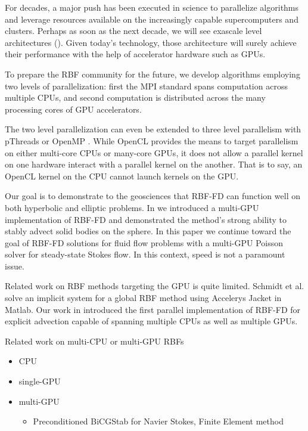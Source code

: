 For decades, a major push has been executed in science to parallelize algorithms and leverage resources available on the increasingly capable supercomputers and clusters. Perhaps as soon as the next decade, we will see exascale level architectures (\cite{ExaScaleRef}). Given today's technology, those architecture will surely achieve their performance with the help of accelerator hardware such as GPUs. 

To prepare the RBF community for the future, we develop algorithms employing two levels of parallelization: first the MPI standard spans computation across multiple CPUs, and second computation is distributed across the many processing cores of GPU accelerators. 

The two level parallelization can even be extended to three level parallelism
with pThreads or OpenMP \cite{NVidia_multi-gpu_example}. While OpenCL provides
the means to target parallelism on either multi-core CPUs or many-core GPUs, it
does not allow a parallel kernel on one hardware interact with a parallel kernel
on the another. That is to say, an OpenCL kernel on the CPU cannot launch
kernels on the GPU.  

Our goal is to demonstrate to the geosciences that RBF-FD can function well on
both hyperbolic and elliptic problems. In \cite{bolligFlyerErlebacher2011} we
introduced a multi-GPU implementation of RBF-FD and demonstrated the method's
strong ability to stably advect solid bodies on the sphere. In this paper we
continue toward the goal of RBF-FD solutions for fluid flow problems with a
multi-GPU Poisson solver for steady-state Stokes flow. In this context, speed is
not a paramount issue.

Related work on RBF methods targeting the GPU is quite limited. Schmidt et al.
\cite{Schmidt2009b} solve an implicit system for a global RBF method using
Accelerys Jacket in Matlab. Our work in \cite{Bollig2011} introduced the first
parallel implementation of RBF-FD for explicit advection capable of spanning
multiple CPUs as well as multiple GPUs. 

Related work on multi-CPU or multi-GPU RBFs
\begin{itemize} 
	\item CPU \cite{Yokota2010} \cite{Wildemann2009}
	\item single-GPU \cite{Schmidt2009b}
	\item multi-GPU 
	\begin{itemize} 
	\item Preconditioned BiCGStab for Navier Stokes, Finite Element method \cite{Goeddeke2009a} 
	\end{itemize} 
\end{itemize} 

